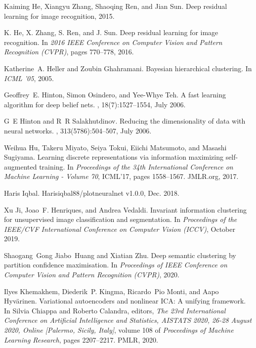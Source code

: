 \documentclass[journal]{IEEEtran}
\begin{document}
{\begin{thebibliography}{10}
Kaiming He, Xiangyu Zhang, Shaoqing Ren, and Jian Sun.
\newblock Deep residual learning for image recognition, 2015.

K. {He}, X. {Zhang}, S. {Ren}, and J. {Sun}.
\newblock Deep residual learning for image recognition.
\newblock In {\em 2016 IEEE Conference on Computer Vision and Pattern
  Recognition (CVPR)}, pages 770--778, 2016.

Katherine~A. Heller and Zoubin Ghahramani.
\newblock Bayesian hierarchical clustering.
\newblock In {\em ICML '05}, 2005.

Geoffrey~E. Hinton, Simon Osindero, and Yee-Whye Teh.
\newblock A fast learning algorithm for deep belief nets.
, 18(7):1527–1554, July 2006.

G~E Hinton and R~R Salakhutdinov.
\newblock Reducing the dimensionality of data with neural networks.
, 313(5786):504--507, July 2006.

Weihua Hu, Takeru Miyato, Seiya Tokui, Eiichi Matsumoto, and Masashi Sugiyama.
\newblock Learning discrete representations via information maximizing
  self-augmented training.
\newblock In {\em Proceedings of the 34th International Conference on Machine
  Learning - Volume 70}, ICML'17, pages 1558--1567. JMLR.org, 2017.

Haris Iqbal.
\newblock Harisiqbal88/plotneuralnet v1.0.0, Dec. 2018.

Xu Ji, Joao~F. Henriques, and Andrea Vedaldi.
\newblock Invariant information clustering for unsupervised image
  classification and segmentation.
\newblock In {\em Proceedings of the IEEE/CVF International Conference on
  Computer Vision (ICCV)}, October 2019.

Shaogang~Gong Jiabo~Huang and Xiatian Zhu.
\newblock Deep semantic clustering by partition confidence maximisation.
\newblock In {\em Proceedings of IEEE Conference on Computer Vision and Pattern
  Recognition (CVPR)}, 2020.

Ilyes Khemakhem, Diederik~P. Kingma, Ricardo~Pio Monti, and Aapo
  Hyv{\"{a}}rinen.
\newblock Variational autoencoders and nonlinear {ICA:} {A} unifying framework.
\newblock In Silvia Chiappa and Roberto Calandra, editors, {\em The 23rd
  International Conference on Artificial Intelligence and Statistics, {AISTATS}
  2020, 26-28 August 2020, Online [Palermo, Sicily, Italy]}, volume 108 of {\em
  Proceedings of Machine Learning Research}, pages 2207--2217. {PMLR}, 2020.


\end{thebibliography}}
\end{document}

